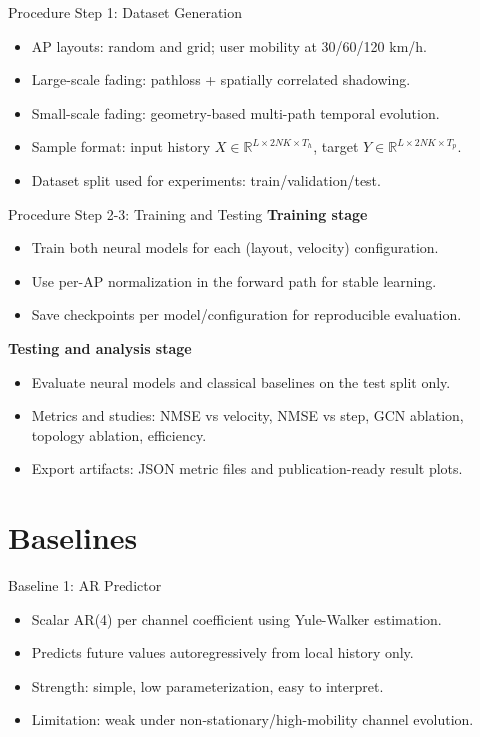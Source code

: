 \documentclass{beamer}
\begin{document}
\begin{frame}{Procedure Step 1: Dataset Generation}
    \footnotesize
    \begin{itemize}
        \item AP layouts: random and grid; user mobility at 30/60/120 km/h.
        \item Large-scale fading: pathloss + spatially correlated shadowing.
        \item Small-scale fading: geometry-based multi-path temporal evolution.
        \item Sample format: input history $X \in \mathbb{R}^{L \times 2NK \times T_h}$, target $Y \in \mathbb{R}^{L \times 2NK \times T_p}$.
        \item Dataset split used for experiments: train/validation/test.
    \end{itemize}
\end{frame}

\begin{frame}{Procedure Step 2-3: Training and Testing}
    \scriptsize
    \textbf{Training stage}
    \begin{itemize}
        \item Train both neural models for each (layout, velocity) configuration.
        \item Use per-AP normalization in the forward path for stable learning.
        \item Save checkpoints per model/configuration for reproducible evaluation.
    \end{itemize}

    \vspace{0.35em}
    \textbf{Testing and analysis stage}
    \begin{itemize}
        \item Evaluate neural models and classical baselines on the test split only.
        \item Metrics and studies: NMSE vs velocity, NMSE vs step, GCN ablation, topology ablation, efficiency.
        \item Export artifacts: JSON metric files and publication-ready result plots.
    \end{itemize}
\end{frame}

\section{Baselines}

\begin{frame}{Baseline 1: AR Predictor}
    \small
    \begin{itemize}
        \item Scalar AR(4) per channel coefficient using Yule-Walker estimation.
        \item Predicts future values autoregressively from local history only.
        \item Strength: simple, low parameterization, easy to interpret.
        \item Limitation: weak under non-stationary/high-mobility channel evolution.
    \end{itemize}
\end{frame}
\end{document}
